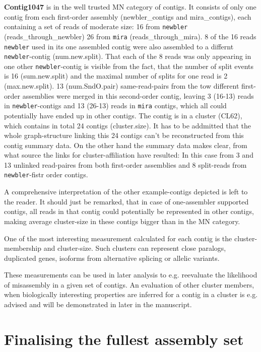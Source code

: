 \textbf{Contig1047} is in the well trusted MN category of contigs. It
consists of only one contig from each first-order assembly
(newbler\_contigs and mira\_contigs), each containing a set of reads
of moderate size: 16 from \texttt{newbler} (reads\_through\_newbler)
26 from \texttt{mira} (reads\_through\_mira). 8 of the 16 reads
\texttt{newbler} used in its one assembled contig were also assembled
to a differnt \texttt{newbler}-contig (num.new.split). That each of
the 8 reads was only appearing in one other \texttt{newbler}-contig is
visible from the fact, that the number of split events is 16
(sum.new.split) and the maximal number of splits for one read is 2
(max.new.split). 13 (num.SndO.pair) same-read-pairs from the tow
different first-order assemblies were merged in this second-order
contig, leaving 3 (16-13) reads in \texttt{newbler}-contigs and 13
(26-13) reads in \texttt{mira} contigs, which all could potentially
have ended up in other contigs. The contig is in a cluster (CL62),
which contains in total 24 contigs (cluster.size). It has to be
addmitted that the whole graph-structure linking this 24 contigs can't
be reconstructed from this contig summary data. On the other hand the
summary data makes clear, from what source the links for
cluster-affiliation have resulted: In this case from 3 and 13 unlinked
read-paires from both first-order assemblies and 8 split-reads from
\texttt{newbler}-fistr order contigs.

A comprehensive interpretation of the other example-contigs depicted
is left to the reader. It should just be remarked, that in case of
one-assembler supported contigs, all reads in that contig could
potentially be represented in other contigs, making average
cluster-size in these contigs bigger than in the MN category.

One of the most interesting measurement calculated for each contig is
the cluster-membership and cluster-size. Such clusters can represent
close paralogs, duplicated genes, isoforms from alternative splicing
or allelic variants.

These measurements can be used in later analysis to e.g. reevaluate
the likelihood of misassembly in a given set of contigs. An evaluation
of other cluster members, when biologically interesting properties are
inferred for a contig in a cluster is e.g. advised and will be
demonstrated in later in the manuscript.


\section{Finalising the fullest assembly set}
\label{sec:final-full-assembly}

